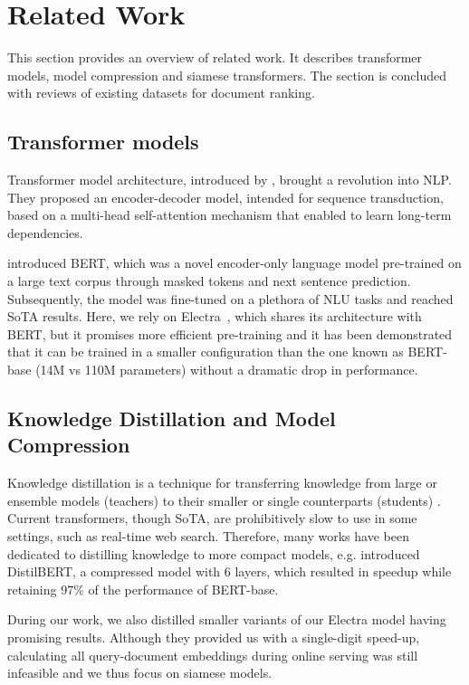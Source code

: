 \documentclass[letterpaper]{article} \usepackage{aaai22 }  \usepackage{times}  \usepackage{helvet}  \usepackage{courier}  \usepackage[hyphens]{url}  \usepackage{graphicx} \usepackage{amsmath,amsfonts,amssymb, mathabx,bm,bbm}
\begin{document}
\section{Related Work}\label{sec:related_work}
This section provides an overview of related work. It describes transformer models, model compression and siamese transformers. The section is concluded with reviews of existing datasets for document ranking.

\subsection{Transformer models}\label{subsec:transformers}
Transformer model architecture, introduced by \citet{vaswani2017attention}, brought a revolution into NLP. They proposed an encoder-decoder model, intended for sequence transduction, based on a multi-head self-attention mechanism that enabled to learn long-term dependencies.

\citet{bert} introduced BERT, which was a novel encoder-only language model pre-trained on a large text corpus through masked tokens and next sentence prediction. Subsequently, the model was fine-tuned on a plethora of NLU tasks and reached SoTA results. Here, we rely on Electra~\cite{electra}, which shares its architecture with BERT, but it promises more efficient pre-training and it has been demonstrated that it can be trained in a smaller configuration than the one known as BERT-base (14M vs 110M parameters) without a dramatic drop in performance.


\subsection{Knowledge Distillation and Model Compression}\label{subsec:KD}
Knowledge distillation is a technique for transferring knowledge from large or ensemble models (teachers) to their smaller or single counterparts (students) \cite{bucila-model_compression}.
Current transformers, though SoTA, are prohibitively slow to  use in some settings, such as real-time web search. Therefore, many works have been dedicated to distilling knowledge to more compact models, e.g. \citet{distilbert} introduced DistilBERT, a compressed model with 6 layers, which resulted in  speedup while retaining 97\% of the performance of BERT-base. 

During our work, we also distilled smaller variants of our Electra model having promising results. 
Although they provided us with a single-digit speed-up, calculating all query-document embeddings during online serving was still infeasible and we thus focus on siamese models.
\end{document}

